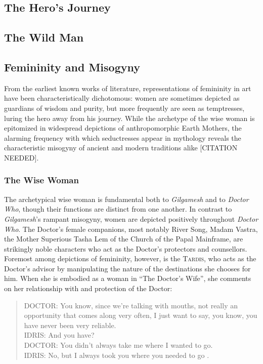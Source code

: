 \documentclass[10pt,a4paper]{article}
\begin{document}
\subsection{The Hero's Journey}
%
%

\subsection{The Wild Man}
%
%

\subsection{Femininity and Misogyny}
From the earliest known works of literature, representations of femininity in art have been characteristically dichotomous: women are sometimes depicted as guardians of wisdom and purity, but more frequently are seen as temptresses, luring the hero away from his journey. While the archetype of the wise woman is epitomized in widespread depictions of anthropomorphic Earth Mothers, the alarming frequency with which seductresses appear in mythology reveals the characteristic misogyny of ancient and modern traditions alike [CITATION NEEDED].

\subsubsection{The Wise Woman}
%
%
The archetypical wise woman is fundamental both to \emph{Gilgamesh} and to \emph{Doctor Who}, though their functions are distinct from one another. In contrast to \emph{Gilgamesh}’s rampant misogyny, women are depicted positively throughout \emph{Doctor Who}. The Doctor’s female companions, most notably River Song, Madam Vastra, the Mother Superious Tasha Lem of the Church of the Papal Mainframe, are strikingly noble characters who act as the Doctor’s protectors and counsellors. Foremost among depictions of femininity, however, is the \textsc{Tardis}, who acts as the Doctor’s advisor by manipulating the nature of the destinations she chooses for him. When she is embodied as a woman in “The Doctor’s Wife”, she comments on her relationship with and protection of the Doctor:
\begin{quote}DOCTOR: You know, since we're talking with mouths, not really an opportunity that comes along very often, I just want to say, you know, you have never been very reliable. 
\\ IDRIS: And you have? 
\\ DOCTOR: You didn't always take me where I wanted to go. 
\\ IDRIS: No, but I always took you where you needed to go \cite{TheDoctor'sWife}. \end{quote}
\end{document}
